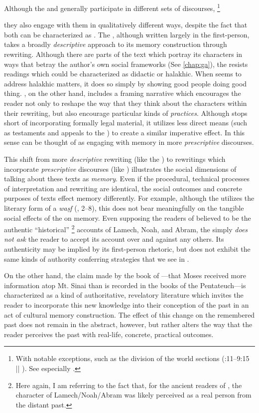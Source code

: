 Although the \ga and \jub generally participate in different sets of discourses,%
    \footnote{With notable exceptions, such as the division of the world sections (:11--9:15 ||  ). See especially \cite[105--130]{machiela2009}.}

they also engage with them in qualitatively different ways, despite the fact that both can be characterized as \psa. The \ga, although written largely in the first-person, takes a broadly \emph{descriptive} approach to its memory construction through rewriting. Although there are parts of the text which portray its characters in ways that betray the author's own social frameworks (See \autoref{chap:ga}), the \ga resists readings which could be characterized as didactic or halakhic. When \ga seems to address halakhic matters, it does so simply by showing good people doing good thing. \jub, on the other hand, includes a framing narrative which encourages the reader not only to reshape the way that they think about the characters within their rewriting, but also encourage particular kinds of \emph{practices}. Although \jub stops short of incorporating formally legal material, it utilizes less direct means (such as testaments and appeals to the \HT) to create a similar imperative effect. In this sense \jub can be thought of as engaging with memory in more \emph{prescriptive} discourses.


This shift from more \emph{descriptive} rewriting (like the \ga) to rewritings which incorporate \emph{prescriptive} discourses (like \jub) illustrates the social dimensions of talking about these texts as \emph{memory}. Even if the procedural, technical processes of interpretation and rewriting are identical, the social outcomes and concrete purposes of texts effect memory differently. For example, although the \ga utilizes the literary form of a \emph{waṣf} (, 2--8), this does not bear meaningfully on the tangible social effects of the \ga on memory. Even supposing the readers of \ga believed \ga to be the authentic ``historical''%
    \footnote{Here again, I am referring to the fact that, for the ancient readers of \jub, the character of Lamech/Noah/Abram was likely perceived as a real person from the distant past.}
accounts of Lamech, Noah, and Abram, the \ga simply \emph{does not ask} the reader to accept its account over and against any others. Its authenticity may be implied by its first-person rhetoric, but \ga does not exhibit the same kinds of authority conferring strategies that we see in \jub. 

On the other hand, the claim made by the book of \jub---that Moses received more information atop Mt. Sinai than is recorded in the books of the Pentateuch---is characterized as a kind of authoritative, revelatory literature which invites the reader to incorporate this new knowledge into their conception of the past in an act of cultural memory construction. The effect of this change on the remembered past does not remain in the abstract, however, but rather alters the way that the reader perceives the past with real-life, concrete, practical outcomes. 
